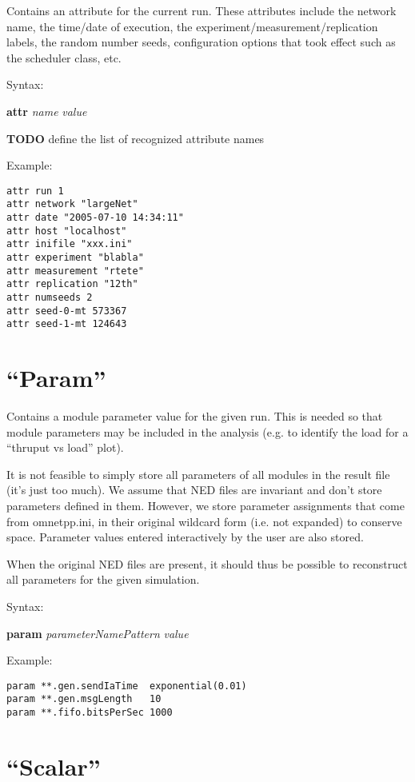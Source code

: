 Contains an attribute for the current run. These attributes include the
network name, the time/date of execution, the
experiment/measurement/replication labels, the random number seeds,
configuration options that took effect such as the scheduler class,
etc.

Syntax:

\hspace{20mm} \textbf{attr} \textit{name} \textit{value}

\textbf{TODO} define the list of recognized attribute names

Example:

\begin{verbatim}
attr run 1
attr network "largeNet"
attr date "2005-07-10 14:34:11"
attr host "localhost"
attr inifile "xxx.ini"
attr experiment "blabla"
attr measurement "rtete"
attr replication "12th"
attr numseeds 2
attr seed-0-mt 573367
attr seed-1-mt 124643
\end{verbatim}

\section{``Param''}

Contains a module parameter value for the given run. This is needed so
that module parameters may be included in the analysis (e.g. to
identify the load for a ``thruput vs load'' plot).

It is not feasible to simply store all parameters of all modules in the
result file (it's just too much). We assume that NED files are
invariant and don't store parameters defined in them. However, we store
parameter assignments that come from omnetpp.ini, in their original
wildcard form (i.e. not expanded) to conserve space. Parameter values
entered interactively by the user are also stored.

When the original NED files are present, it should thus be possible to
reconstruct all parameters for the given simulation.

Syntax:

\hspace{20mm} \textbf{param} \textit{parameterNamePattern} \textit{value}

Example:

\begin{verbatim}
param **.gen.sendIaTime  exponential(0.01)
param **.gen.msgLength   10
param **.fifo.bitsPerSec 1000
\end{verbatim}


\section{``Scalar''}

